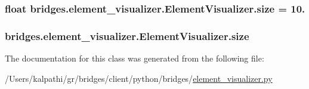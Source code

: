 \subsubsection[{size}]{\setlength{\rightskip}{0pt plus 5cm}float bridges.\+element\+\_\+visualizer.\+Element\+Visualizer.\+size = 10.\hspace{0.3cm}{\ttfamily [static]}}\label{classbridges_1_1element__visualizer_1_1_element_visualizer_ad8effb64ea33382a723c2c4948048d17}
\hypertarget{classbridges_1_1element__visualizer_1_1_element_visualizer_a375c56195d1c86d3a658e923be40cb71}{}
\subsubsection[{size}]{\setlength{\rightskip}{0pt plus 5cm}bridges.\+element\+\_\+visualizer.\+Element\+Visualizer.\+size}\label{classbridges_1_1element__visualizer_1_1_element_visualizer_a375c56195d1c86d3a658e923be40cb71}


The documentation for this class was generated from the following file\+:\begin{DoxyCompactItemize}
\item 
/\+Users/kalpathi/gr/bridges/client/python/bridges/\hyperlink{element__visualizer_8py}{element\+\_\+visualizer.\+py}\end{DoxyCompactItemize}
